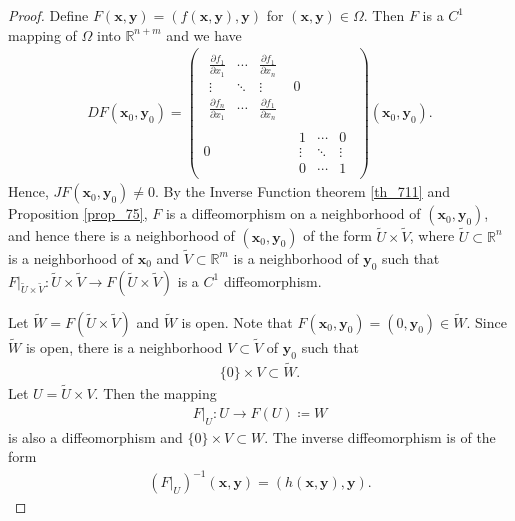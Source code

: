 \documentclass[10pt]{book}
\theoremstyle{definition}
\numberwithin{equation}{chapter}
\begin{document}
\begin{proof}
Define $F(\mathbf{x},\mathbf{y}) = \left(f(\mathbf{x},\mathbf{y}), \mathbf{y}\right)$ for $(\mathbf{x},\mathbf{y}) \in \Omega$. Then $F$ is a $C^1$ mapping of $\Omega$ into $\mathbb{R}^{n+m}$ and we have
\begin{align*}
    DF(\mathbf{x}_0,\mathbf{y}_0) = 
    \begin{pmatrix}
        \begin{matrix}
            \frac{\partial f_1}{\partial x_1} & \cdots & \frac{\partial f_1}{\partial x_n} \\
            \vdots & \ddots & \vdots \\
            \frac{\partial f_n}{\partial x_1} & \cdots & \frac{\partial f_1}{\partial x_n}
        \end{matrix} & 0 \\
        0 & \begin{matrix}
            1 & \cdots & 0 \\
            \vdots & \ddots & \vdots \\
            0 & \cdots & 1
        \end{matrix}
    \end{pmatrix}(\mathbf{x}_0,\mathbf{y}_0).
\end{align*}
Hence, $JF(\mathbf{x}_0,\mathbf{y}_0) \neq 0$. By the Inverse Function theorem \ref{th_711} and Proposition \ref{prop_75}, $F$ is a diffeomorphism on a neighborhood of $(\mathbf{x}_0,\mathbf{y}_0)$, and hence there is a neighborhood of $(\mathbf{x}_0,\mathbf{y}_0)$ of the form $\widetilde{U} \times \widetilde{V}$, where $\widetilde{U} \subset \mathbb{R}^n$ is a neighborhood of $\mathbf{x}_0$ and $\widetilde{V} \subset \mathbb{R}^m$ is a neighborhood of $\mathbf{y}_0$ such that $F|_{\widetilde{U} \times \widetilde{V}}: \widetilde{U} \times \widetilde{V} \to F(\widetilde{U} \times \widetilde{V})$ is a $C^1$ diffeomorphism. 

Let $\widetilde{W} = F(\widetilde{U} \times \widetilde{V})$ and $\widetilde{W}$ is open. Note that $F(\mathbf{x}_0,\mathbf{y}_0) = (0,\mathbf{y}_0) \in \widetilde{W}$. Since $\widetilde{W}$ is open, there is a neighborhood $V \subset \widetilde{V}$ of $\mathbf{y}_0$ such that 
\begin{align*}
    \{0\} \times V \subset \widetilde{W}.
\end{align*}
Let $U = \widetilde{U} \times V$. Then the mapping
\begin{align*}
    F|_{U}: U \to F(U) \coloneqq W
\end{align*}
is also a diffeomorphism and $\{0\} \times V \subset W$. The inverse diffeomorphism is of the form
\begin{align*}
    \left(F|_{U}\right)^{-1}(\mathbf{x}, \mathbf{y}) = (h(\mathbf{x}, \mathbf{y}), \mathbf{y}).
\end{align*}


\end{proof}
\end{document}
